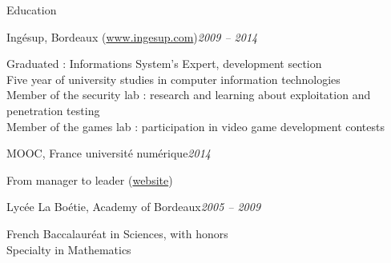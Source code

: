\begin{rSection}{Education}

  \begin{rSubsection}{Ing\'{e}sup, Bordeaux (\href{www.ingesup.com}{www.ingesup.com})}{\em 2009 -- 2014}{}{}
    \item[] Graduated : Informations System's Expert, development section \\
    Five year of university studies in computer information technologies \\
    Member of the security lab : research and learning about exploitation and penetration testing \\
    Member of the games lab : participation in video game development contests
  \end{rSubsection}

  \begin{rSubsection}{MOOC, France universit\'{e} num\'{e}rique}{\em 2014}{}{}
    \item[] From manager to leader (\href{https://www.france-universite-numerique-mooc.fr/courses/CNAM/01002/Trimestre_1_2014/about}{website})
  \end{rSubsection}

  \begin{rSubsection}{Lyc\'{e}e La Bo\'{e}tie, Academy of Bordeaux}{\em 2005 -- 2009}{}{}
    \item[] French Baccalaur\'{e}at in Sciences, with honors \\
    Specialty in Mathematics
  \end{rSubsection}

\end{rSection}
